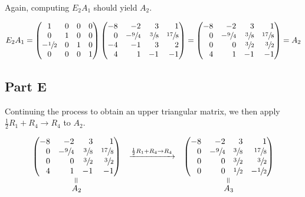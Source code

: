 \documentclass[12pt]{article}
\newcommand{\veq}{\mathrel{\rotatebox{90}{$=$}}}
\begin{document}
Again, computing $E_2A_1$ should yield $A_2$.

$$
E_2A_1 = \begin{pmatrix*}[c]
    1 & 0 & 0 & 0 \\
    0 & 1 & 0 & 0 \\
    -\sfrac{1}{2} & 0 & 1 & 0 \\
    0 & 0 & 0 & 1
\end{pmatrix*}
\begin{pmatrix*}[r]
    -8 & -2 & 3 & 1 \\
    0 & -\sfrac{9}{4} & \sfrac{3}{8}  & \sfrac{17}{8} \\
    -4 & -1 & 3 & 2 \\
    4 & 1 & -1 & -1
\end{pmatrix*}
= \begin{pmatrix*}[r]
        -8 & -2 & 3 & 1 \\
        0 & -\sfrac{9}{4} & \sfrac{3}{8}  & \sfrac{17}{8} \\
        0 & 0 & \sfrac{3}{2} & \sfrac{3}{2} \\
        4 & 1 & -1 & -1
\end{pmatrix*}
= A_2
$$

\subsection*{Part E}

Continuing the process to obtain an upper triangular matrix, we then apply $\frac{1}{2}R_1 + R_4 \to R_4$ to $A_2$.

$$
\begin{array}{ccc}
    \begin{pmatrix*}[r]
        -8 & -2 & 3 & 1 \\
        0 & -\sfrac{9}{4} & \sfrac{3}{8}  & \sfrac{17}{8} \\
        0 & 0 & \sfrac{3}{2} & \sfrac{3}{2} \\
        4 & 1 & -1 & -1
    \end{pmatrix*}
    &\xrightarrow{\frac{1}{2}R_1 + R_4 \to R_4}
    &\begin{pmatrix*}[r]
        -8 & -2 & 3 & 1 \\
        0 & -\sfrac{9}{4} & \sfrac{3}{8}  & \sfrac{17}{8} \\
        0 & 0 & \sfrac{3}{2} & \sfrac{3}{2} \\
        0 & 0 & \sfrac{1}{2} & -\sfrac{1}{2}
    \end{pmatrix*}
    \\
    \overset{\veq}{A_2} & & \overset{\veq}{A_3}
\end{array}
$$
\end{document}
